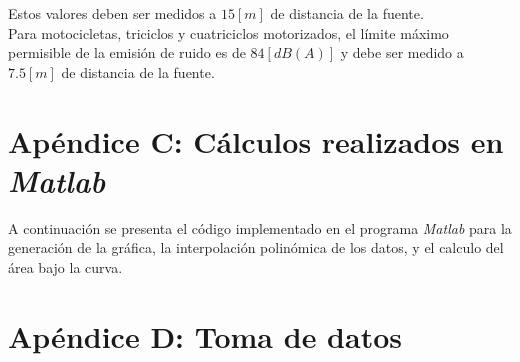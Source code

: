 \documentclass[letter,11pt]{article}
\newcommand{\source}[1]{\vspace{-11pt} \caption*{\small{\textbf{Nota:} {#1}}}}
\begin{document}
\begin{enumerate}
Estos valores deben ser medidos a $15 [m]$ de distancia de la fuente. \\

Para motocicletas, triciclos y cuatriciclos motorizados, el límite máximo
permisible de la emisión de ruido es de $84 [dB(A)]$ y debe ser medido a
$7.5 [m]$ de distancia de la fuente.
\end{enumerate}

\newpage
\section*{Apéndice C: Cálculos realizados en \emph{Matlab}}

A continuación se presenta el código implementado en el programa \emph{Matlab}
para la generación de la gráfica, la interpolación polinómica de los datos, y
el calculo del área bajo la curva.

%

%

\newpage
\section*{Apéndice D: Toma de datos}


\end{document}
